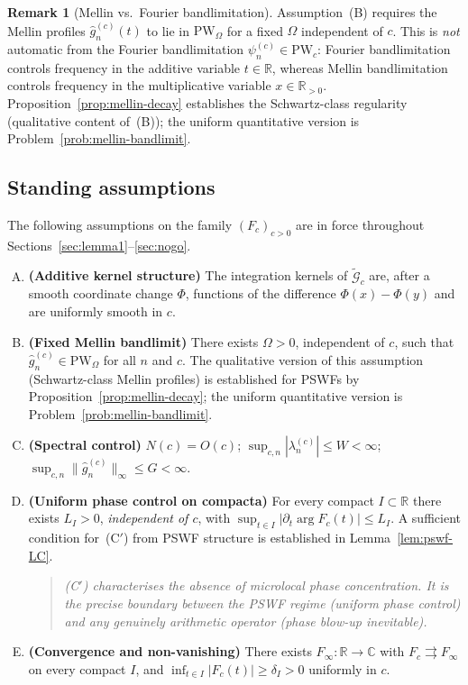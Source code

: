 \documentclass[12pt,a4paper]{amsart}
\theoremstyle{definition}
\newtheorem{remark}[theorem]{Remark}
\newcommand{\PW}{\mathrm{PW}_\Omega}
\newcommand{\tGc}{\widetilde{\mathcal{G}}_c}
\begin{document}
\begin{remark}[Mellin vs.\ Fourier bandlimitation]
\label{rem:mellin-bandlimit}
Assumption~(B) requires the Mellin profiles
$\widehat{g}_n^{(c)}(t)$ to lie in $\PW$ for a fixed
$\Omega$ independent of $c$. This is \emph{not}
automatic from the Fourier bandlimitation
$\psi_n^{(c)} \in \mathrm{PW}_c$: Fourier
bandlimitation controls frequency in the additive
variable $t \in \mathbb{R}$, whereas Mellin
bandlimitation controls frequency in the multiplicative
variable $x \in \mathbb{R}_{>0}$.
Proposition~\ref{prop:mellin-decay} establishes the
Schwartz-class regularity (qualitative content of~(B));
the uniform quantitative version is
Problem~\ref{prob:mellin-bandlimit}.
\end{remark}

\subsection{Standing assumptions}

The following assumptions on the family $(F_c)_{c>0}$
are in force throughout
Sections~\ref{sec:lemma1}--\ref{sec:nogo}.

\begin{enumerate}[(A)]
\item \textbf{(Additive kernel structure)}
The integration kernels of $\tGc$ are, after a smooth
coordinate change $\Phi$, functions of the difference
$\Phi(x)-\Phi(y)$ and are uniformly smooth in $c$.

\item \textbf{(Fixed Mellin bandlimit)}
There exists $\Omega > 0$, independent of $c$, such
that $\widehat{g}_n^{(c)} \in \PW$ for all $n$ and
$c$. The qualitative version of this assumption
(Schwartz-class Mellin profiles) is established for
PSWFs by Proposition~\ref{prop:mellin-decay}; the
uniform quantitative version is
Problem~\ref{prob:mellin-bandlimit}.

\item \textbf{(Spectral control)}
$N(c) = O(c)$;
$\sup_{c,n}|\lambda_n^{(c)}| \le W < \infty$;
$\sup_{c,n}\|\widehat{g}_n^{(c)}\|_\infty
\le G < \infty$.

\item[(C$'$)] \textbf{(Uniform phase control on
compacta)} For every compact $I \subset \mathbb{R}$
there exists $L_I > 0$, \emph{independent of $c$},
with $\sup_{t \in I}|\partial_t \arg F_c(t)| \le L_I$.
A sufficient condition for~(C$'$) from PSWF structure
is established in Lemma~\ref{lem:pswf-LC}.
\begin{quote}\small
\emph{(C$'$) characterises the absence of microlocal
phase concentration. It is the precise boundary between
the PSWF regime (uniform phase control) and any
genuinely arithmetic operator (phase blow-up
inevitable).}
\end{quote}

\item \textbf{(Convergence and non-vanishing)}
There exists $F_\infty : \mathbb{R} \to \mathbb{C}$
with $F_c \rightrightarrows F_\infty$ on every compact
$I$, and $\inf_{t \in I}|F_c(t)| \ge \delta_I > 0$
uniformly in $c$.
\end{enumerate}
\end{document}

